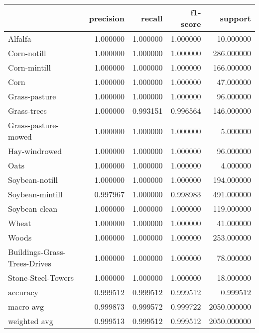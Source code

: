 \begin{tabular}{lrrrr}
\toprule
{} &  precision &    recall &  f1-score &      support \\
\midrule
Alfalfa                      &   1.000000 &  1.000000 &  1.000000 &    10.000000 \\
Corn-notill                  &   1.000000 &  1.000000 &  1.000000 &   286.000000 \\
Corn-mintill                 &   1.000000 &  1.000000 &  1.000000 &   166.000000 \\
Corn                         &   1.000000 &  1.000000 &  1.000000 &    47.000000 \\
Grass-pasture                &   1.000000 &  1.000000 &  1.000000 &    96.000000 \\
Grass-trees                  &   1.000000 &  0.993151 &  0.996564 &   146.000000 \\
Grass-pasture-mowed          &   1.000000 &  1.000000 &  1.000000 &     5.000000 \\
Hay-windrowed                &   1.000000 &  1.000000 &  1.000000 &    96.000000 \\
Oats                         &   1.000000 &  1.000000 &  1.000000 &     4.000000 \\
Soybean-notill               &   1.000000 &  1.000000 &  1.000000 &   194.000000 \\
Soybean-mintill              &   0.997967 &  1.000000 &  0.998983 &   491.000000 \\
Soybean-clean                &   1.000000 &  1.000000 &  1.000000 &   119.000000 \\
Wheat                        &   1.000000 &  1.000000 &  1.000000 &    41.000000 \\
Woods                        &   1.000000 &  1.000000 &  1.000000 &   253.000000 \\
Buildings-Grass-Trees-Drives &   1.000000 &  1.000000 &  1.000000 &    78.000000 \\
Stone-Steel-Towers           &   1.000000 &  1.000000 &  1.000000 &    18.000000 \\
accuracy                     &   0.999512 &  0.999512 &  0.999512 &     0.999512 \\
macro avg                    &   0.999873 &  0.999572 &  0.999722 &  2050.000000 \\
weighted avg                 &   0.999513 &  0.999512 &  0.999512 &  2050.000000 \\
\bottomrule
\end{tabular}
